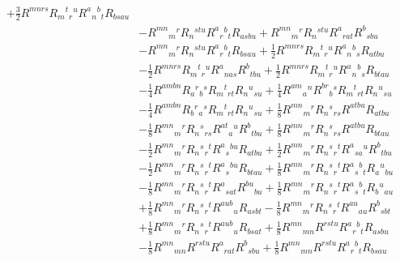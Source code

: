 \begin{equation}
\begin{aligned}
+ \frac{3}{2} R^{m n r s} R_{m}{}^{t}{}_{r}{}^{u} R^{a}{}_{n}{}^{b}{}_{t} R_{b s a u} \\
& - R^{m n}{}_{m}{}^{r} R_{n}{}^{s t u} R^{a}{}_{r}{}^{b}{}_{t} R_{a s b u}
+ R^{m n}{}_{m}{}^{r} R_{n}{}^{s t u} R^{a}{}_{r a t} R^{b}{}_{s b u} \\
& - R^{m n}{}_{m}{}^{r} R_{n}{}^{s t u} R^{a}{}_{r}{}^{b}{}_{t} R_{b s a u}
+ \frac{1}{2} R^{m n r s} R_{m}{}^{t}{}_{r}{}^{u} R^{a}{}_{n}{}^{b}{}_{s} R_{a t b u} \\
& - \frac{1}{2} R^{m n r s} R_{m}{}^{t}{}_{r}{}^{u} R^{a}{}_{n a s} R^{b}{}_{t b u}
+ \frac{1}{2} R^{m n r s} R_{m}{}^{t}{}_{r}{}^{u} R^{a}{}_{n}{}^{b}{}_{s} R_{b t a u} \\
& - \frac{1}{4} R^{a m b n} R_{a}{}^{r}{}_{b}{}^{s} R_{m}{}^{t}{}_{r t} R_{n}{}^{u}{}_{s u}
+ \frac{1}{4} R^{a m}{}_{a}{}^{n} R^{b r}{}_{b}{}^{s} R_{m}{}^{t}{}_{r t} R_{n}{}^{u}{}_{s u} \\
& - \frac{1}{4} R^{a m b n} R_{b}{}^{r}{}_{a}{}^{s} R_{m}{}^{t}{}_{r t} R_{n}{}^{u}{}_{s u}
+ \frac{1}{8} R^{m n}{}_{m}{}^{r} R_{n}{}^{s}{}_{r s} R^{a t b u} R_{a t b u} \\
& - \frac{1}{8} R^{m n}{}_{m}{}^{r} R_{n}{}^{s}{}_{r s} R^{a t}{}_{a}{}^{u} R^{b}{}_{t b u}
+ \frac{1}{8} R^{m n}{}_{m}{}^{r} R_{n}{}^{s}{}_{r s} R^{a t b u} R_{b t a u} \\
& - \frac{1}{2} R^{m n}{}_{m}{}^{r} R_{n}{}^{s}{}_{r}{}^{t} R^{a}{}_{s}{}^{b u} R_{a t b u}
+ \frac{1}{2} R^{m n}{}_{m}{}^{r} R_{n}{}^{s}{}_{r}{}^{t} R^{a}{}_{s a}{}^{u} R^{b}{}_{t b u} \\
& - \frac{1}{2} R^{m n}{}_{m}{}^{r} R_{n}{}^{s}{}_{r}{}^{t} R^{a}{}_{s}{}^{b u} R_{b t a u}
+ \frac{1}{8} R^{m n}{}_{m}{}^{r} R_{n}{}^{s}{}_{r}{}^{t} R^{a}{}_{s}{}^{b}{}_{t} R_{a}{}^{u}{}_{b u} \\
& - \frac{1}{8} R^{m n}{}_{m}{}^{r} R_{n}{}^{s}{}_{r}{}^{t} R^{a}{}_{s a t} R^{b u}{}_{b u}
+ \frac{1}{8} R^{m n}{}_{m}{}^{r} R_{n}{}^{s}{}_{r}{}^{t} R^{a}{}_{s}{}^{b}{}_{t} R_{b}{}^{u}{}_{a u} \\
& + \frac{1}{8} R^{m n}{}_{m}{}^{r} R_{n}{}^{s}{}_{r}{}^{t} R^{a u b}{}_{u} R_{a s b t}
- \frac{1}{8} R^{m n}{}_{m}{}^{r} R_{n}{}^{s}{}_{r}{}^{t} R^{a u}{}_{a u} R^{b}{}_{s b t} \\
& + \frac{1}{8} R^{m n}{}_{m}{}^{r} R_{n}{}^{s}{}_{r}{}^{t} R^{a u b}{}_{u} R_{b s a t}
+ \frac{1}{8} R^{m n}{}_{m n} R^{r s t u} R^{a}{}_{r}{}^{b}{}_{t} R_{a s b u} \\
& - \frac{1}{8} R^{m n}{}_{m n} R^{r s t u} R^{a}{}_{r a t} R^{b}{}_{s b u}
+ \frac{1}{8} R^{m n}{}_{m n} R^{r s t u} R^{a}{}_{r}{}^{b}{}_{t} R_{b s a u}
\end{aligned}
\end{equation}
